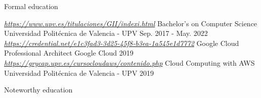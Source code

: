


\begin{center}Formal education\end{center}
\begin{cventries}
  \cvent
    {\href{https://www.upv.es/titulaciones/GII/indexi.html}{\textit{https://www.upv.es/titulaciones/GII/indexi.html}}} %
    {Bachelor's on Computer Science} %
    {Universidad Politécnica de Valencia  - UPV} %
    {Sep. 2017 - May. 2022} %
  \cvent
    {\href{https://credential.net/e1c3fad3-3d25-45f8-b3ea-1a545e1d7772}{\textit{https://credential.net/e1c3fad3-3d25-45f8-b3ea-1a545e1d7772}}} %
    {Google Cloud Professional Architect} %
    {Google Cloud} %
    {2019} %
  \cvent
    {\href{https://grycap.upv.es/cursocloudaws/contenido.php}{\textit{https://grycap.upv.es/cursocloudaws/contenido.php}}} %
    {Cloud Computing with AWS} %
    {Universidad Politécnica de Valencia  - UPV} %
    {2019} %
\end{cventries}
\newpage
{}
\begin{center}Noteworthy education\end{center}
